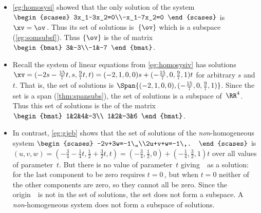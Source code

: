 \begin{example} \label{eg:nullsp}
\begin{itemize}
\item  \cref{eg:homosysi} showed that the only solution of the  system \(\begin{scases}
3x_1-3x_2=0\\-x_1-7x_2=0
\end{scases}\) is \(\xv=\ov\)\,.
Thus its set of solutions is~\(\{\ov\}\) which is a subspace (\cref{eg:somsubsf}).
Thus \(\{\ov\}\) is the  of matrix \(\begin{bmat} 3&-3\\-1&-7 \end{bmat}\).

\item Recall the  system of linear equations from \cref{eg:homosysiv} has solutions \(\xv=(-2s-\frac{15}7t,s,\frac97t,t) =(-2,1,0,0)s+(-\frac{15}7,0,\frac97,1)t\) for arbitrary \(s\) and~\(t\).
That is, the set of solutions is \(\Span\{(-2,1,0,0),(-\frac{15}7,0,\frac97,1)\}\).
Since the set is a span (\cref{thm:spansubs}), the set of solutions is a subspace of~\(\RR^4\).
Thus this set of solutions is the  of the matrix \(\begin{bmat} 1&2&4&-3\\
1&2&-3&6 \end{bmat}\).

\item In contrast, \cref{eg:gjeb} shows that the set of solutions of the \emph{non}-homogeneous system \(\begin{scases}
-2v+3w=-1\,,\\2u+v+w=-1\,.
\end{scases}\)
is \((u,v,w)=(-\frac34-\frac14t,\frac12+\frac32t,t)
=(-\frac34,\frac12,0)+(-\frac14,\frac32,1)t\)
over all values of parameter~\(t\).
But there is no value of parameter~\(t\) giving~\ov\ as a solution: for the last component to be zero requires \(t=0\)\,, but when \(t=0\) neither of the other components are zero, so they cannot all be zero.
Since the origin~\ov\ is not in the set of solutions, the set does not form a subspace. 
A \emph{non}-homogeneous system does not form a subspace of solutions.
\end{itemize}
\end{example}


